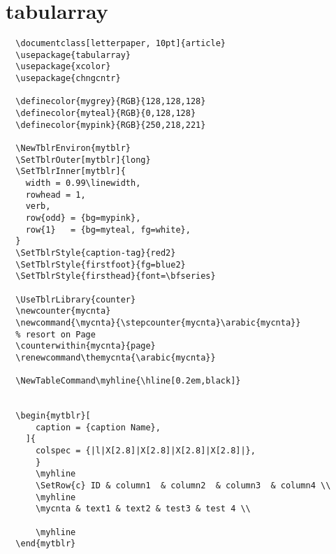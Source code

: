 \section{tabularray \textcolor{green}{} \textcolor{blue}{}  \textcolor{cyan}{} }

\begin{verbatim}
  \documentclass[letterpaper, 10pt]{article}
  \usepackage{tabularray}
  \usepackage{xcolor}
  \usepackage{chngcntr}

  \definecolor{mygrey}{RGB}{128,128,128}
  \definecolor{myteal}{RGB}{0,128,128}
  \definecolor{mypink}{RGB}{250,218,221}

  \NewTblrEnviron{mytblr}
  \SetTblrOuter[mytblr]{long}
  \SetTblrInner[mytblr]{
    width = 0.99\linewidth,
    rowhead = 1,
    verb,
    row{odd} = {bg=mypink}, 
    row{1}   = {bg=myteal, fg=white},
  }
  \SetTblrStyle{caption-tag}{red2}
  \SetTblrStyle{firstfoot}{fg=blue2}
  \SetTblrStyle{firsthead}{font=\bfseries}

  \UseTblrLibrary{counter}
  \newcounter{mycnta}
  \newcommand{\mycnta}{\stepcounter{mycnta}\arabic{mycnta}}
  % resort on Page
  \counterwithin{mycnta}{page}
  \renewcommand\themycnta{\arabic{mycnta}}

  \NewTableCommand\myhline{\hline[0.2em,black]}
  
  
  \begin{mytblr}[
      caption = {caption Name},
    ]{
      colspec = {|l|X[2.8]|X[2.8]|X[2.8]|X[2.8]|},
      }
      \myhline
      \SetRow{c} ID & column1  & column2  & column3  & column4 \\
      \myhline
      \mycnta & text1 & text2 & test3 & test 4 \\
      
      \myhline
  \end{mytblr}
  
\end{verbatim}

\newpage
